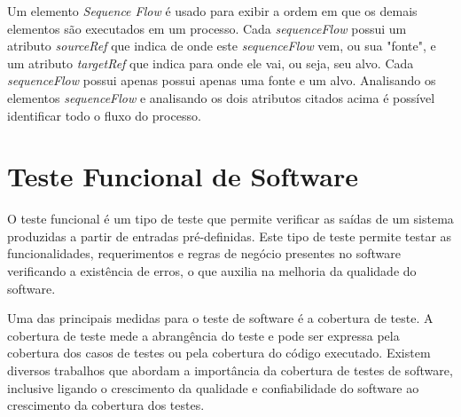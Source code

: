 \documentclass[12pt]{article}
\begin{document}

Um elemento \emph{Sequence Flow} é usado para exibir a ordem em que os demais elementos são executados em um processo. Cada \emph{sequenceFlow} possui um atributo \emph{sourceRef} que indica de onde este \emph{sequenceFlow} vem, ou sua "fonte", e um atributo \emph{targetRef} que indica para onde ele vai, ou seja, seu alvo. Cada \emph{sequenceFlow} possui apenas possui apenas uma fonte e um alvo. Analisando os elementos \emph{sequenceFlow} e analisando os dois atributos citados acima é possível identificar todo o fluxo do processo.


\section{Teste Funcional de Software}
O teste funcional é um tipo de teste que permite verificar as saídas de um sistema produzidas a partir de entradas pré-definidas. Este tipo de teste permite testar as funcionalidades, requerimentos e regras de negócio presentes no software\cite{molinari2003testes} verificando a existência de erros, o que auxilia na melhoria da qualidade do software.

Uma das principais medidas para o teste de software é a cobertura de teste. A cobertura de teste mede a abrangência do teste e pode ser expressa pela cobertura dos casos de testes ou pela cobertura do código executado. Existem diversos trabalhos que abordam a importância da cobertura de testes de software\cite{zhu1997software,bieman1996using}, inclusive ligando o crescimento da qualidade e confiabilidade do software ao crescimento da cobertura dos testes\cite{malaiya2002software}.

\end{document}
